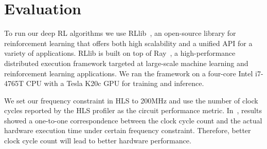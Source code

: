 \section{Evaluation} %
\label{sec:results}
To run our deep RL algorithms we use RLlib~\cite{liang2017rllib}, an open-source library for reinforcement learning that offers both high scalability and a unified API for a variety of applications. RLlib is built on top of Ray~\cite{moritz2018ray}, a high-performance distributed execution framework targeted at large-scale machine learning and reinforcement learning applications. We ran the framework on a four-core Intel i7-4765T CPU%
with a Tesla K20c GPU%
for training and inference. 

We set our frequency constraint in HLS to 200MHz and use the number of clock cycles reported by the HLS profiler as the circuit performance metric.
In~\cite{huang2013effect}, results showed a one-to-one correspondence between the clock cycle count and the actual hardware execution time under certain frequency constraint. Therefore, better clock cycle count will lead to better hardware performance.
